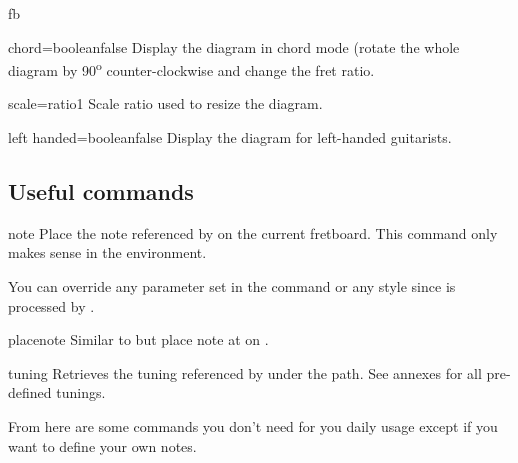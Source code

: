 \documentclass[a4paper]{article}
\begin{document}
\begin{docEnvironment}{fb}{}
  \begin{docKey}[fb][]{chord}{=boolean}{false}
    Display the diagram in chord mode (rotate the whole diagram by
    90\textsuperscript{o} counter-clockwise and change the fret ratio.
  \end{docKey}

  \begin{docKey}[fb][]{scale}{=ratio}{1}
    Scale ratio used to resize the diagram.
  \end{docKey}

  \begin{docKey}[fb][]{left handed}{=boolean}{false}
    Display the diagram for left-handed guitarists.
  \end{docKey}

\end{docEnvironment}

\subsection{Useful commands}

\begin{docCommand}{note}{}
  Place the note referenced by  on the current fretboard. This
  command only makes sense in the  environment.

  You can override any parameter set in the  command or
  any  style since  is processed by
  .
\end{docCommand}

\begin{docCommand}{placenote}{}
  Similar to  but place note  at 
  on .
\end{docCommand}


\begin{docCommand}{tuning}{}
  Retrieves the tuning referenced by  under the
   path. See annexes for all pre-defined tunings.
\end{docCommand}

From here are some commands you don't need for you daily usage except if you
want to define your own notes.
\end{document}
